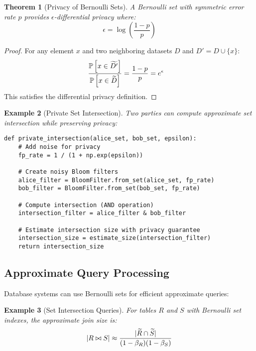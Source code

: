 \documentclass[11pt,final,hidelinks]{article}
\newtheorem{theorem}{Theorem}[section]
\newtheorem{example}[theorem]{Example}
\newcommand{\ASet}[1]{\obs{#1}}  %
\begin{document}
\begin{theorem}[Privacy of Bernoulli Sets]
A Bernoulli set with symmetric error rate $p$ provides $\epsilon$-differential privacy where:
\begin{equation}
\epsilon = \log\left(\frac{1-p}{p}\right)
\end{equation}
\end{theorem}

\begin{proof}
For any element $x$ and two neighboring datasets $D$ and $D' = D \cup \{x\}$:
\begin{align}
\frac{\Prob{x \in \ASet{D'}}}{\Prob{x \in \ASet{D}}} &= \frac{1-p}{p} = e^\epsilon
\end{align}
This satisfies the differential privacy definition.
\end{proof}

\begin{example}[Private Set Intersection]
Two parties can compute approximate set intersection while preserving privacy:
\begin{verbatim}
def private_intersection(alice_set, bob_set, epsilon):
    # Add noise for privacy
    fp_rate = 1 / (1 + np.exp(epsilon))
    
    # Create noisy Bloom filters
    alice_filter = BloomFilter.from_set(alice_set, fp_rate)
    bob_filter = BloomFilter.from_set(bob_set, fp_rate)
    
    # Compute intersection (AND operation)
    intersection_filter = alice_filter & bob_filter
    
    # Estimate intersection size with privacy guarantee
    intersection_size = estimate_size(intersection_filter)
    return intersection_size
\end{verbatim}
\end{example}

\subsection{Approximate Query Processing}

Database systems can use Bernoulli sets for efficient approximate queries:

\begin{example}[Set Intersection Queries]
For tables $R$ and $S$ with Bernoulli set indexes, the approximate join size is:
\begin{equation}
\Card{R \bowtie S} \approx \frac{\Card{\ASet{R} \cap \ASet{S}}}{(1-\fnrate_R)(1-\fnrate_S)}
\end{equation}
\end{example}
\end{document}
